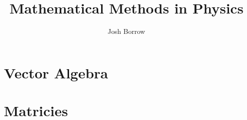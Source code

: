 \documentclass[11pt]{report}
\begin{document}
\title{Mathematical Methods in Physics}
\author{Josh Borrow}

\maketitle

\chapter{Vector Algebra}




\chapter{Matricies}


\end{document}
